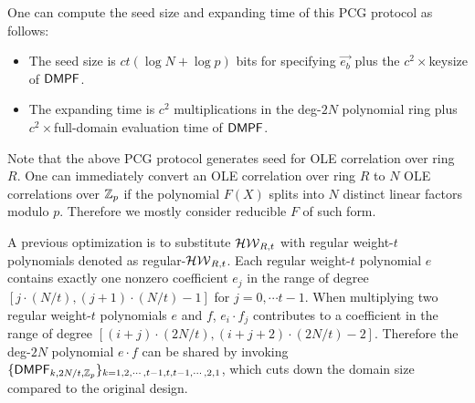 One can compute the seed size and expanding time of this PCG protocol as follows: 
\begin{itemize}
    \item The seed size is $ct(\log N+\log p)$ bits for specifying $\vec{e_b}$ plus the $c^2\times $keysize of ${\sf DMPF}$. 
    \item The expanding time is $c^2$ multiplications in the deg-$2N$ polynomial ring plus $c^2\times$full-domain evaluation time of ${\sf DMPF}$. 
\end{itemize}

\begin{remark}\label{rem:use_reducible_ring}
    Note that the above PCG protocol generates seed for OLE correlation over ring $R$. One can immediately convert an OLE correlation over ring $R$ to $N$ OLE correlations over $\mathbb{Z}_p$ if the polynomial $F(X)$ splits into $N$ distinct linear factors modulo $p$. Therefore we mostly consider reducible $F$ of such form. 
\end{remark}

A previous optimization is to substitute $\mathcal{HW}_{R,t}$ with regular weight-$t$ polynomials denoted as regular-$\mathcal{HW}_{R,t}$. Each regular weight-$t$ polynomial $e$ contains exactly one nonzero coefficient $e_j$ in the range of degree $[j\cdot (N/t), (j+1)\cdot (N/t)-1]$ for $j=0,\cdots t-1$. When multiplying two regular weight-$t$ polynomials $e$ and $f$, $e_i\cdot f_j$ contributes to a coefficient in the range of degree $[(i+j)\cdot (2N/t), (i+j+2)\cdot (2N/t)-2]$. Therefore the deg-$2N$ polynomial $e\cdot f$ can be shared by invoking $\{{\sf DMPF}_{k, 2N/t, \mathbb{Z}_p}\}_{k=1,2,\cdots,t-1,t,t-1,\cdots, 2,1}$, which cuts down the domain size compared to the original design. 

